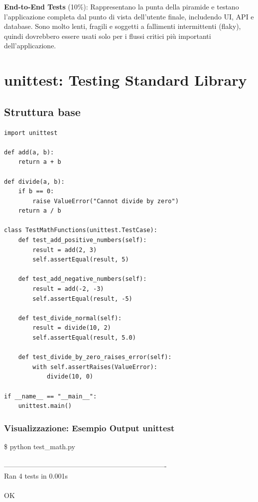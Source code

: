 \textbf{End-to-End Tests} (10\%): Rappresentano la punta della piramide e testano l'applicazione completa dal punto di vista dell'utente finale, includendo UI, API e database. Sono molto lenti, fragili e soggetti a fallimenti intermittenti (flaky), quindi dovrebbero essere usati solo per i flussi critici più importanti dell'applicazione.

\section{unittest: Testing Standard Library}

\subsection{Struttura base}

\begin{lstlisting}
import unittest

def add(a, b):
    return a + b

def divide(a, b):
    if b == 0:
        raise ValueError("Cannot divide by zero")
    return a / b

class TestMathFunctions(unittest.TestCase):
    def test_add_positive_numbers(self):
        result = add(2, 3)
        self.assertEqual(result, 5)

    def test_add_negative_numbers(self):
        result = add(-2, -3)
        self.assertEqual(result, -5)

    def test_divide_normal(self):
        result = divide(10, 2)
        self.assertEqual(result, 5.0)

    def test_divide_by_zero_raises_error(self):
        with self.assertRaises(ValueError):
            divide(10, 0)

if __name__ == "__main__":
    unittest.main()
\end{lstlisting}

\subsubsection{Visualizzazione: Esempio Output unittest}

\begin{tcolorbox}[colback=black!90, coltext=white, fontupper=\ttfamily\footnotesize, title=Terminal: unittest output]
\textcolor{green!80}{\$ python test\_math.py}\\
\textcolor{white}{....}\\
\textcolor{green!60}{----------------------------------------------------------------------}\\
\textcolor{green!60}{Ran 4 tests in 0.001s}\\
\\
\textcolor{green!80}{OK}
\end{tcolorbox}

